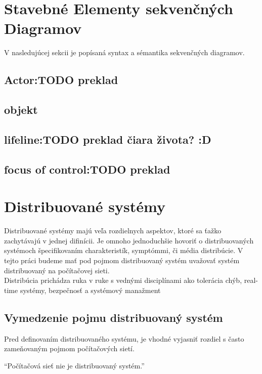 \section{Stavebné Elementy sekvenčných Diagramov}

V nasledujúcej sekcii je popísaná syntax a sémantika sekvenčných diagramov.

\subsection{Actor:TODO preklad}

\subsection{objekt}

\subsection{lifeline:TODO preklad čiara života? :D}

\subsection{focus of control:TODO preklad}

\section{Distribuované systémy}

Distribuované systémy majú veľa rozdielnych aspektov, ktoré sa ťažko zachytávajú v jednej difinícii. Je omnoho jednoduchšie hovoriť o distribuovaných systémoch špecifikovaním charakteristík, symptómmi, či média distribúcie. \cite{} V tejto práci budeme mať pod pojmom distribuovaný systém uvažovať systém distribuovaný na počítačovej sieti. \\

Distribúcia prichádza ruka v ruke s vednými disciplínami ako tolerácia chýb, real-time systémy, bezpečnosť a systémový manažment

\subsection{Vymedzenie pojmu distribuovaný systém}

Pred definovaním distribuovaného systému, je vhodné vyjasniť rozdiel s často zameňovaným pojmom počítačových sietí.

\begin{displayquote}
	``Počítačová sieť nie je distribuovaný systém.''
\end{displayquote}

